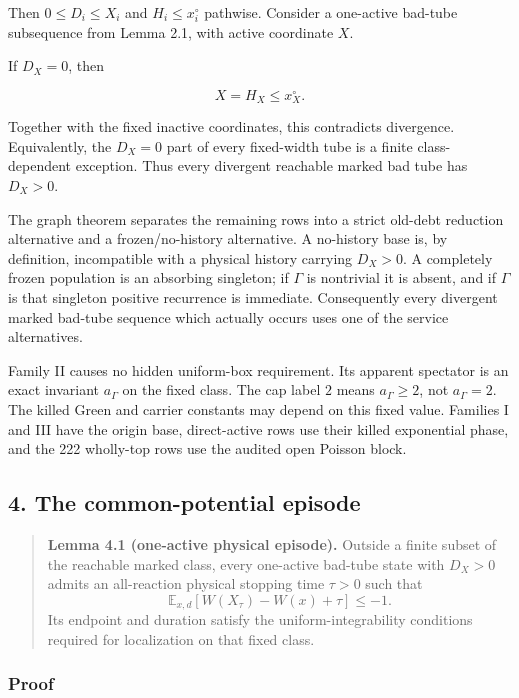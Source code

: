 Then \(0\le D_i\le X_i\) and \(H_i\le x_i^\circ\) pathwise. Consider a
one-active bad-tube subsequence from Lemma 2.1, with active coordinate
\(X\).

If \(D_X=0\), then

\[
 X=H_X\le x_X^\circ.                                \tag{3.2}
\]

Together with the fixed inactive coordinates, this contradicts
divergence. Equivalently, the \(D_X=0\) part of every fixed-width tube
is a finite class-dependent exception. Thus every divergent reachable
marked bad tube has \(D_X>0\).

The graph theorem separates the remaining rows into a strict old-debt
reduction alternative and a frozen/no-history alternative. A no-history
base is, by definition, incompatible with a physical history carrying
\(D_X>0\). A completely frozen population is an absorbing singleton; if
\(\Gamma\) is nontrivial it is absent, and if \(\Gamma\) is that
singleton positive recurrence is immediate. Consequently every divergent
marked bad-tube sequence which actually occurs uses one of the service
alternatives.

Family II causes no hidden uniform-box requirement. Its apparent
spectator is an exact invariant \(a_\Gamma\) on the fixed class. The cap
label \(2\) means \(a_\Gamma\ge2\), not \(a_\Gamma=2\). The killed Green
and carrier constants may depend on this fixed value. Families I and III
have the origin base, direct-active rows use their killed exponential
phase, and the 222 wholly-top rows use the audited open Poisson block.

\subsection{4. The common-potential
episode}

\begin{quote}
\textbf{Lemma 4.1 (one-active physical episode).} Outside a finite
subset of the reachable marked class, every one-active bad-tube state
with \(D_X>0\) admits an all-reaction physical stopping time \(\tau>0\)
such that \[
 {\mathbb E}_{x,d}
 [W(X_\tau)-W(x)+\tau]\le-1.                       \tag{4.1}
\] Its endpoint and duration satisfy the uniform-integrability
conditions required for localization on that fixed class.
\end{quote}

\subsubsection{Proof}

